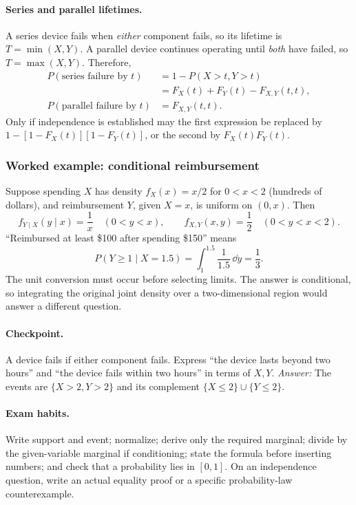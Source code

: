 \paragraph{Series and parallel lifetimes.} A series device fails when \emph{either} component fails, so its lifetime is $T=\min(X,Y)$. A parallel device continues operating until \emph{both} have failed, so $T=\max(X,Y)$. Therefore,
\[
\begin{aligned}
P(\text{series failure by }t)
 &=1-P(X>t,Y>t)\\
 &=F_X(t)+F_Y(t)-F_{X,Y}(t,t),\\
P(\text{parallel failure by }t)&=F_{X,Y}(t,t).
\end{aligned}
\]
Only if independence is established may the first expression be replaced by $1-[1-F_X(t)][1-F_Y(t)]$, or the second by $F_X(t)F_Y(t)$.

\subsubsection*{Worked example: conditional reimbursement}
Suppose spending $X$ has density $f_X(x)=x/2$ for $0<x<2$ (hundreds of dollars), and reimbursement $Y$, given $X=x$, is uniform on $(0,x)$. Then
\[
 f_{Y\mid X}(y\mid x)=\frac1x\quad(0<y<x),\qquad
 f_{X,Y}(x,y)=\frac12\quad(0<y<x<2).
\]
``Reimbursed at least \$100 after spending \$150'' means
\[
 P(Y\geq1\mid X=1.5)=\int_1^{1.5}\frac{1}{1.5}\,\dd y=\frac13.
\]
The unit conversion must occur before selecting limits. The answer is conditional, so integrating the original joint density over a two-dimensional region would answer a different question.

\paragraph{Checkpoint.} A device fails if either component fails. Express ``the device lasts beyond two hours'' and ``the device fails within two hours'' in terms of $X,Y$. \emph{Answer:} The events are $\{X>2,Y>2\}$ and its complement $\{X\leq2\}\cup\{Y\leq2\}$.

\paragraph{Exam habits.} Write support and event; normalize; derive only the required marginal; divide by the given-variable marginal if conditioning; state the formula before inserting numbers; and check that a probability lies in $[0,1]$. On an independence question, write an actual equality proof or a specific probability-law counterexample.

